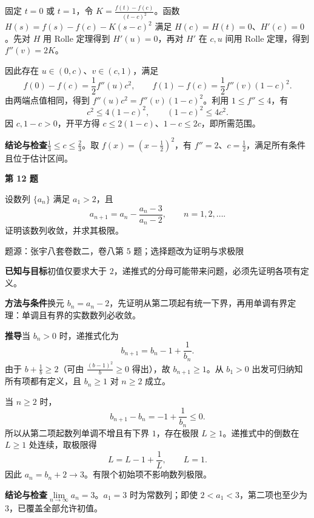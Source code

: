 \documentclass[UTF8,zihao=-4,fontset=fandol]{ctexart}
\renewcommand{\lim}{\operatorname*{lim}\limits}
\newcommand{\Question}[4]{\clearpage\def\CurrentNumber{#1}\def\CurrentSource{#4}\pdfbookmark[1]{第#1题}{q#1}{\small\color{accent}模拟卷 3\hfill #2 · #3 分}\par{\Large\bfseries 第 #1 题}\par\medskip\fontsize{14}{22}\selectfont}
\newcommand{\Solution}{\clearpage\fontsize{12}{18}\selectfont{\large\bfseries 第 \CurrentNumber\ 题解析}\par{\footnotesize\color{gray}题源：\CurrentSource}\par\smallskip}
\newcommand{\Known}{\par\textbf{已知与目标}\quad}
\newcommand{\Method}{\par\textbf{方法与条件}\quad}
\newcommand{\Derive}{\par\textbf{推导}\quad}
\renewcommand{\Check}{\par\textbf{结论与检查}\quad}
\begin{document}
固定 $t=0$ 或 $t=1$，令 $K=\frac{f(t)-f(c)}{(t-c)^2}$。函数 $H(s)=f(s)-f(c)-K(s-c)^2$ 满足 $H(c)=H(t)=0$、$H'(c)=0$。先对 $H$ 用 Rolle 定理得到 $H'(u)=0$，再对 $H'$ 在 $c,u$ 间用 Rolle 定理，得到 $f''(v)=2K$。

因此存在 $u\in(0,c)$、$v\in(c,1)$，满足
\[
f(0)-f(c)=\frac12f''(u)c^2,\qquad
f(1)-f(c)=\frac12f''(v)(1-c)^2.
\]
由两端点值相同，得到 $f''(u)c^2=f''(v)(1-c)^2$。利用 $1\le f''\le4$，有
\[
c^2\le4(1-c)^2,\qquad (1-c)^2\le4c^2.
\]
因 $c,1-c>0$，开平方得 $c\le2(1-c)$、$1-c\le2c$，即所需范围。
\Check $\boxed{\frac13\le c\le\frac23}$。取 $f(x)=(x-\frac12)^2$，有 $f''=2$、$c=\frac12$，满足所有条件且位于估计区间。

\Question{12}{解答}{15}{张宇八套卷数二，卷八第 5 题；选择题改为证明与求极限}
设数列 $\{a_n\}$ 满足 $a_1>2$，且
\[
a_{n+1}=a_n-\frac{a_n-3}{a_n-2},\qquad n=1,2,\ldots.
\]
证明该数列收敛，并求其极限。
\Solution
\Known 初值仅要求大于 $2$，递推式的分母可能带来问题，必须先证明各项有定义。
\Method 换元 $b_n=a_n-2$，先证明从第二项起有统一下界，再用单调有界定理：单调且有界的实数数列必收敛。
\Derive 当 $b_n>0$ 时，递推式化为
\[
b_{n+1}=b_n-1+\frac1{b_n}.
\]
由于 $b+\frac1b\ge2$（可由 $\frac{(b-1)^2}{b}\ge0$ 得出），故 $b_{n+1}\ge1$。从 $b_1>0$ 出发可归纳知所有项都有定义，且 $b_n\ge1$ 对 $n\ge2$ 成立。

当 $n\ge2$ 时，
\[
b_{n+1}-b_n=-1+\frac1{b_n}\le0.
\]
所以从第二项起数列单调不增且有下界 $1$，存在极限 $L\ge1$。递推式中的倒数在 $L\ge1$ 处连续，取极限得
\[
L=L-1+\frac1L,\qquad L=1.
\]
因此 $a_n=b_n+2\to3$。有限个初始项不影响数列极限。
\Check $\boxed{\lim_{n\to\infty}a_n=3}$。$a_1=3$ 时为常数列；即使 $2<a_1<3$，第二项也至少为 $3$，已覆盖全部允许初值。
\end{document}

